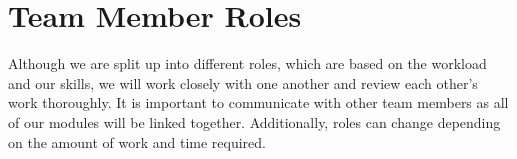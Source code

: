 \documentclass{article}
\begin{document}
\section{Team Member Roles}
Although we are split up into different roles, which are based on the workload and our skills, we will work closely with one another and review each other's work thoroughly. It is important to communicate with other team members as all of our modules will be linked together. Additionally, roles can change depending on the amount of work and time required. 
\begin{comment}
\begin{table}[]
	\centering
	\begin{tabular}{| m{5em} | m{4cm}| m{5cm} |}
	\hline
	Member						 & Role                                           & Description                                                                                                                                                                                                                \\ \hline
	Abraham Taha                 & Application Developer                          & This position is focused on creating a web application for the end user. This will allow the end user to interface with the hardware and change the sounds to detect.  \\ \hline
	Jordan Bierbrier             & Signal Processing / Embedded Systems Developer &                                                                                                                                                                                                      \\ \hline
	Taranjit Lotey               & Application Developer                          & Communication between application and hardware / backend development to send physical signals to user                                                                                                                      \\ \hline
	Azriel Gingoyon              & Hardware Developer                             & Cost-effective component research, wristband design, motor/microcontroller integration                                                                                                                                     \\ \hline
	Udeep Shah                   & Signal Processing / Embedded Systems Developer & Noise filtering, signal isolation resource optimization and power optimization                                                                                                                      \\ \hline
	\end{tabular}
\end{table}
\end{comment}
\end{document}
